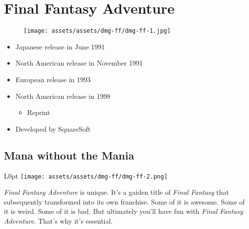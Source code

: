 \documentclass{book}
\begin{document}
\begingroup \chapter*{Final Fantasy Adventure} \endgroup
\begin{figure}[H]
\vskip 4pt
\centering
\texttt{[image: assets/assets/dmg-ff/dmg-ff-1.jpg]}\end{figure}
\begin{itemize} [nosep]




\item Japanese release in June 1991







\item North American release in November 1991







\item European release in 1993







\item North American release in 1998
\begin{itemize} [nosep]\item Reprint\end{itemize}\noindent











\item Developed by SquareSoft

\end{itemize}\noindent

\newpage\FloatBarrier\needspace{10mm}\section*{Mana without the Mania}\nopagebreak[4]
\begin{wrapfigure}{L}{0pt} \texttt{[image: assets/assets/dmg-ff/dmg-ff-2.png]}\end{wrapfigure}
\emph{Final Fantasy Adventure} is unique. It’s a gaiden title of \emph{Final Fantasy} that subsequently transformed into its own franchise. Some of it is awesome. Some of it is weird. Some of it is bad. But ultimately you’ll have fun with \emph{Final Fantasy Adventure}. That’s why it’s essential.
\end{document}
